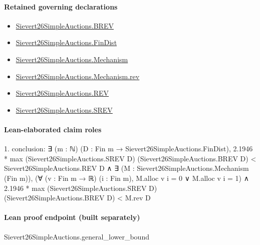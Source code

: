 \documentclass[10pt]{article}
\begin{document}
\paragraph{Retained governing declarations}
\begin{itemize}\raggedright
\item \hyperlink{paper-prerequisite-e0c4e0f254386cff}{Sievert26\allowbreak{}Simple\allowbreak{}Auctions.\allowbreak{}BREV}
\item \hyperlink{paper-prerequisite-5b39ea21863ce14e}{Sievert26\allowbreak{}Simple\allowbreak{}Auctions.\allowbreak{}Fin\allowbreak{}Dist}
\item \hyperlink{paper-prerequisite-b1d558d0810cbb0e}{Sievert26\allowbreak{}Simple\allowbreak{}Auctions.\allowbreak{}Mechanism}
\item \hyperlink{governing-declaration-8a7d9cf1128641b7}{Sievert26\allowbreak{}Simple\allowbreak{}Auctions.\allowbreak{}Mechanism.\allowbreak{}rev}
\item \hyperlink{paper-prerequisite-8bbfb5082359244f}{Sievert26\allowbreak{}Simple\allowbreak{}Auctions.\allowbreak{}REV}
\item \hyperlink{paper-prerequisite-de82ecb4c67c171b}{Sievert26\allowbreak{}Simple\allowbreak{}Auctions.\allowbreak{}SREV}
\end{itemize}
\paragraph{Lean-elaborated claim roles}\begin{ReviewVerbatim}
1. conclusion: ∃ (m : ℕ) (D : Fin m → Sievert26SimpleAuctions.FinDist),
  2.1946 * max (Sievert26SimpleAuctions.SREV D) (Sievert26SimpleAuctions.BREV D) < Sievert26SimpleAuctions.REV D ∧
    ∃ (M : Sievert26SimpleAuctions.Mechanism (Fin m)),
      (∀ (v : Fin m → ℝ) (i : Fin m), M.alloc v i = 0 ∨ M.alloc v i = 1) ∧
        2.1946 * max (Sievert26SimpleAuctions.SREV D) (Sievert26SimpleAuctions.BREV D) < M.rev D
\end{ReviewVerbatim}

\paragraph{Lean proof endpoint (built separately)}\begin{ReviewVerbatim}
Sievert26SimpleAuctions.general_lower_bound
\end{ReviewVerbatim}
\end{document}
